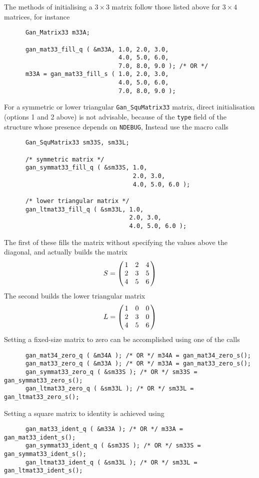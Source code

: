 The methods of initialising a $3\times 3$ matrix follow those listed above
for $3\times 4$ matrices, for instance
\begin{verbatim}
      Gan_Matrix33 m33A;

      gan_mat33_fill_q ( &m33A, 1.0, 2.0, 3.0,
                                4.0, 5.0, 6.0,
                                7.0, 8.0, 9.0 ); /* OR */
      m33A = gan_mat33_fill_s ( 1.0, 2.0, 3.0,
                                4.0, 5.0, 6.0,
                                7.0, 8.0, 9.0 );
\end{verbatim}
For a symmetric or lower triangular
{\tt Gan\_SquMatrix33} matrix, direct initialisation (options 1 and 2 above) is
not advisable, because of the {\tt type} field of the structure whose
presence depends on {\tt NDEBUG}, Instead use the macro calls
\begin{verbatim}
      Gan_SquMatrix33 sm33S, sm33L;

      /* symmetric matrix */
      gan_symmat33_fill_q ( &sm33S, 1.0,
                                    2.0, 3.0,
                                    4.0, 5.0, 6.0 );

      /* lower triangular matrix */
      gan_ltmat33_fill_q ( &sm33L, 1.0,
                                   2.0, 3.0,
                                   4.0, 5.0, 6.0 );
\end{verbatim}
The first of these fills the matrix without specifying the values above the
diagonal, and actually builds the matrix
\[ S = \beginm{ccc} 1 & 2 & 4 \\ 2 & 3 & 5 \\ 4 & 5 & 6\endm
\]
The second builds the lower triangular matrix
\[ L = \beginm{ccc} 1 & 0 & 0 \\ 2 & 3 & 0 \\ 4 & 5 & 6\endm
\]
Setting a fixed-size matrix to zero can be accomplished using one of the calls
\begin{verbatim}
      gan_mat34_zero_q ( &m34A ); /* OR */ m34A = gan_mat34_zero_s();
      gan_mat33_zero_q ( &m33A ); /* OR */ m33A = gan_mat33_zero_s();
      gan_symmat33_zero_q ( &sm33S ); /* OR */ sm33S = gan_symmat33_zero_s();
      gan_ltmat33_zero_q ( &sm33L ); /* OR */ sm33L = gan_ltmat33_zero_s();
\end{verbatim}

Setting a square matrix to identity is achieved using
\begin{verbatim}
      gan_mat33_ident_q ( &m33A ); /* OR */ m33A = gan_mat33_ident_s();
      gan_symmat33_ident_q ( &sm33S ); /* OR */ sm33S = gan_symmat33_ident_s();
      gan_ltmat33_ident_q ( &sm33L ); /* OR */ sm33L = gan_ltmat33_ident_s();
\end{verbatim}

